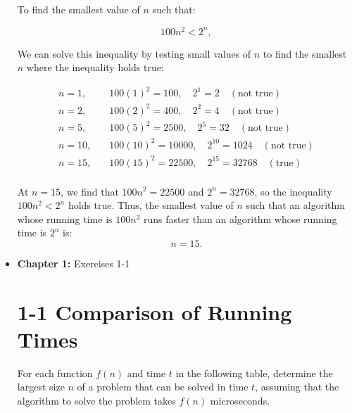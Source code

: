 \documentclass{article}
\begin{document}
\begin{itemize}
To find the smallest value of \(n\) such that:

\[
100n^2 < 2^n,
\]

We can solve this inequality by testing small values of \(n\) to find the smallest \(n\) where the inequality holds true:

\begin{align*}
n = 1, & \quad 100(1)^2 = 100, \quad 2^1 = 2 \quad (\text{not true}) \\
n = 2, & \quad 100(2)^2 = 400, \quad 2^2 = 4 \quad (\text{not true}) \\
n = 5, & \quad 100(5)^2 = 2500, \quad 2^5 = 32 \quad (\text{not true}) \\
n = 10, & \quad 100(10)^2 = 10000, \quad 2^{10} = 1024 \quad (\text{not true}) \\
n = 15, & \quad 100(15)^2 = 22500, \quad 2^{15} = 32768 \quad (\text{true}) \\
\end{align*}

At \(n = 15\), we find that \(100n^2 = 22500\) and \(2^n = 32768\), so the inequality \(100n^2 < 2^n\) holds true. Thus, the smallest value of \(n\) such that an algorithm whose running time is \(100n^2\) runs faster than an algorithm whose running time is \(2^n\) is:
\[
\boxed{n = 15.}
\]

    \item \textbf{Chapter 1:} Exercises 1-1
\section*{1-1 Comparison of Running Times}

For each function \( f(n) \) and time \( t \) in the following table, determine the largest size \( n \) of a problem that can be solved in time \( t \), assuming that the algorithm to solve the problem takes \( f(n) \) microseconds.


\end{itemize}
\end{document}
